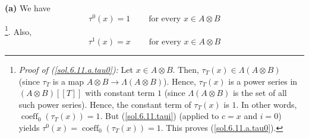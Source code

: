 \documentclass[numbers=enddot,12pt,final,onecolumn,notitlepage]{scrartcl}%
\begin{document}
\textbf{(a)} We have
\begin{equation}
\tau^{0}\left(  x\right)  =1\ \ \ \ \ \ \ \ \ \ \text{for every }x\in A\otimes
B \label{sol.6.11.a.tau0}%
\end{equation}
\footnote{\textit{Proof of (\ref{sol.6.11.a.tau0}):} Let $x\in A\otimes B$.
Then, $\tau_{T}\left(  x\right)  \in\Lambda\left(  A\otimes B\right)  $ (since
$\tau_{T}$ is a map $A\otimes B\rightarrow\Lambda\left(  A\otimes B\right)
$). Hence, $\tau_{T}\left(  x\right)  $ is a power series in $\left(  A\otimes
B\right)  \left[  \left[  T\right]  \right]  $ with constant term $1$ (since
$\Lambda\left(  A\otimes B\right)  $ is the set of all such power series).
Hence, the constant term of $\tau_{T}\left(  x\right)  $ is $1$. In other
words, $\operatorname*{coeff}\nolimits_{0}\left(  \tau_{T}\left(  x\right)
\right)  =1$. But (\ref{sol.6.11.taui}) (applied to $c=x$ and $i=0$) yields
$\tau^{0}\left(  x\right)  =\operatorname*{coeff}\nolimits_{0}\left(  \tau
_{T}\left(  x\right)  \right)  =1$. This proves (\ref{sol.6.11.a.tau0}).}.
Also,%
\begin{equation}
\tau^{1}\left(  x\right)  =x\ \ \ \ \ \ \ \ \ \ \text{for every }x\in A\otimes
B \label{sol.6.11.a.tau1}%
\end{equation}
\end{document}
